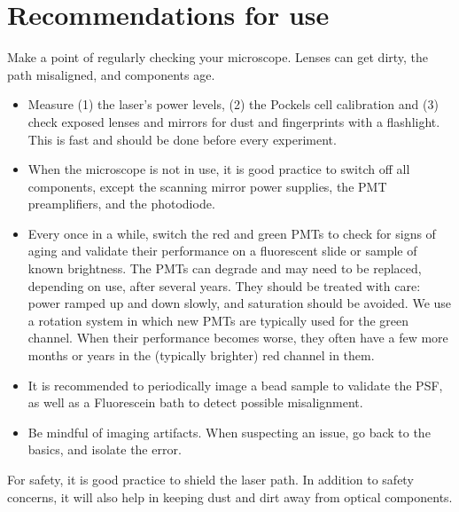\documentclass[10pt,letterpaper]{article}
\begin{document}
\section{Recommendations for use}
Make a point of regularly checking your microscope. Lenses can get dirty, the path misaligned, and components age.
%
\begin{itemize}
    \item Measure (1) the laser's power levels, (2) the Pockels cell calibration and (3) check exposed lenses and mirrors for dust and fingerprints with a flashlight. This is fast and should be done before every experiment.
    \item When the microscope is not in use, it is good practice to switch off all components, except the scanning mirror power supplies, the PMT preamplifiers, and the photodiode.
    \item Every once in a while, switch the red and green PMTs to check for signs of aging and validate their performance on a fluorescent slide or sample of known brightness. The PMTs can degrade and may need to be replaced, depending on use, after several years. They should be treated with care: power ramped up and down slowly, and saturation should be avoided. We use a rotation system in which new PMTs are typically used for the green channel. When their performance becomes worse, they often have a few more months or years in the (typically brighter) red channel in them.
    \item It is recommended to periodically image a bead sample to validate the PSF, as well as a Fluorescein bath to detect possible misalignment.
    \item Be mindful of imaging artifacts. When suspecting an issue, go back to the basics, and isolate the error.
\end{itemize}
%
 For safety, it is good practice to shield the laser path. In addition to safety concerns, it will also help in keeping dust and dirt away from optical components.

\nolinenumbers
\end{document}
